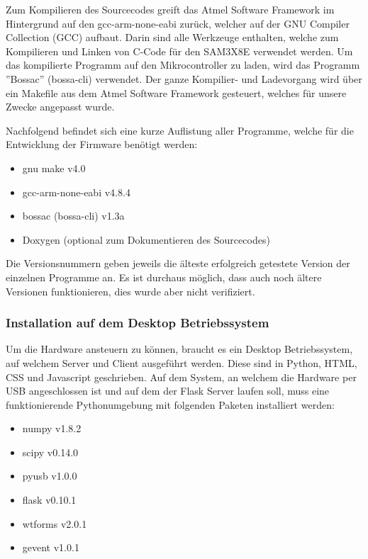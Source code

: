 Zum Kompilieren des Sourcecodes greift das Atmel Software Framework im Hintergrund auf den gcc-arm-none-eabi zurück, welcher auf der GNU Compiler Collection (GCC) aufbaut. Darin sind alle Werkzeuge enthalten, welche zum Kompilieren und Linken von C-Code für den SAM3X8E verwendet werden. Um das kompilierte Programm auf den Mikrocontroller zu laden, wird das Programm ''Bossac'' (bossa-cli) verwendet. Der ganze Kompilier- und Ladevorgang wird über ein Makefile aus dem Atmel Software Framework gesteuert, welches für unsere Zwecke angepasst wurde.

Nachfolgend befindet sich eine kurze Auflistung aller Programme, welche für die Entwicklung der Firmware benötigt werden:

\begin{itemize}
	\item gnu make			v4.0
	\item gcc-arm-none-eabi		v4.8.4
	\item bossac (bossa-cli)	v1.3a
	\item Doxygen (optional zum Dokumentieren des Sourcecodes)
\end{itemize}

Die Versionsnummern geben jeweils die älteste erfolgreich getestete Version der einzelnen Programme an. Es ist durchaus möglich, dass auch noch ältere Versionen funktionieren, dies wurde aber nicht verifiziert.


\clearpage
\subsubsection{Installation auf dem Desktop Betriebssystem}\label{sec:installation_auf_dem_desktop_betriebssystem}
Um die Hardware ansteuern zu können, braucht es ein Desktop Betriebssystem, auf welchem Server und Client ausgeführt werden. Diese sind in Python, HTML, CSS und Javascript geschrieben. Auf dem System, an welchem die Hardware per USB angeschlossen ist und auf dem der Flask Server laufen soll, muss eine funktionierende Pythonumgebung mit folgenden Paketen installiert werden:

\begin{itemize}
	\item numpy	v1.8.2
	\item scipy	v0.14.0
	\item pyusb	v1.0.0
	\item flask	v0.10.1
	\item wtforms	v2.0.1
	\item gevent	v1.0.1
\end{itemize}


